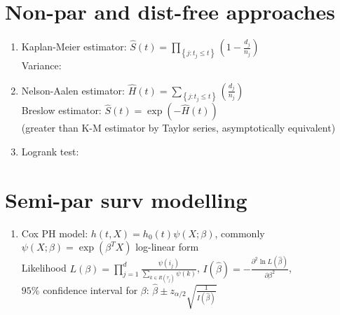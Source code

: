 \documentclass[11pt,a4paper]{article}
\begin{document}
\section*{Non-par and dist-free approaches}
\begin{enumerate}[resume]
\item Kaplan-Meier estimator: $\displaystyle \hat{S}(t) = \prod_{\left\{ j: t_j \leq t \right\}} \left( 1- \frac{d_j}{n_j} \right)$ \\
Variance: 

\item Nelson-Aalen estimator: $\displaystyle \hat{H}(t) = \sum_{\left\{ j: t_j \leq t \right\}} \left( \frac{d_j}{n_j} \right)$ \\
Breslow estimator: $\displaystyle \hat{S}(t) = \exp \left( - \hat{H} (t) \right)$ \\
(greater than K-M estimator by Taylor series, asymptotically equivalent)

\item Logrank test: 
\end{enumerate}

\section*{Semi-par surv modelling}
\begin{enumerate}[resume]
\item Cox PH model: $h(t,X) = h_0 (t) \psi (X;\beta)$, commonly $\psi (X;\beta) = \exp \left( \beta^T X \right)$ log-linear form \\
Likelihood $\displaystyle L(\beta) = \prod_{j=1}^d \frac{\psi(i_j)}{\sum_{k \in R(\tau_j)} \psi(k)}$, $\displaystyle I(\hat{\beta}) = - \frac{\partial^2 \ln L(\hat{\beta})}{\partial \beta^2}$, \\
$95\%$ confidence interval for $\beta$: $\displaystyle \hat{\beta} \pm z_{\alpha/2} \sqrt{\frac{1}{I(\hat{\beta})}}$

\end{enumerate}
\end{document}
